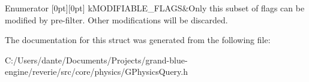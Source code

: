 \begin{DoxyEnumFields}{Enumerator}
[0pt][0pt]{}\mbox{\label{structrev_1_1_hit_enum_a0084e22d4d5d750565239ebcde227412a4dd8bb414be4e91c2232a0dd79362a8b}} 
k\+M\+O\+D\+I\+F\+I\+A\+B\+L\+E\+\_\+\+F\+L\+A\+GS&Only this subset of flags can be modified by pre-\/filter. Other modifications will be discarded. \\
\hline

\end{DoxyEnumFields}


The documentation for this struct was generated from the following file\+:\begin{DoxyCompactItemize}
\item 
C\+:/\+Users/dante/\+Documents/\+Projects/grand-\/blue-\/engine/reverie/src/core/physics/G\+Physics\+Query.\+h\end{DoxyCompactItemize}
